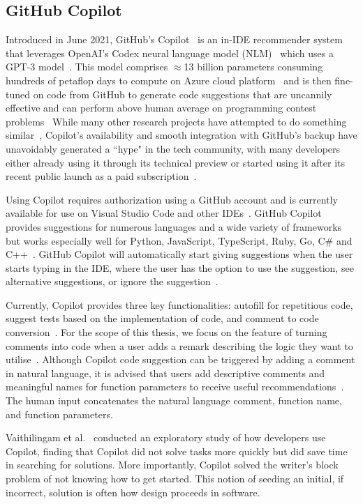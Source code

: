 \subsection{GitHub Copilot}
Introduced in June 2021, GitHub's Copilot~\cite{Copilot-web} is an in-IDE recommender system that leverages OpenAI's Codex neural language model (NLM)~\cite{copilot} which uses a GPT-3 model~\cite{Gpt3}. This model comprises $\approx$13 billion parameters consuming hundreds of petaflop days to compute on Azure cloud platform~\cite{copilot} and is then fine-tuned on code from GitHub to generate code suggestions that are uncannily effective and can perform above human average on programming contest problems~\cite{empirical_eval}
While many other research projects have attempted to do something similar~\cite{codesearch, natural, coacor}, Copilot's availability and smooth integration with GitHub's backup have unavoidably generated a ``hype" in the tech community, with many developers either already using it through its technical preview or started using it after its recent public launch as a paid subscription~\cite{Copilot-web}. 

Using Copilot requires authorization using a GitHub account and is currently available for use on Visual Studio Code and other IDEs~\cite{Copilot-web}. GitHub Copilot provides suggestions for numerous languages and a wide variety of frameworks but works especially well for Python, JavaScript, TypeScript, Ruby, Go, C\# and C++~\cite{Copilot-web}. GitHub Copilot will automatically start giving suggestions when the user starts typing in the IDE, where the user has the option to use the suggestion, see alternative suggestions, or ignore the suggestion~\cite{Copilot-web}.

Currently, Copilot provides three key functionalities: autofill for repetitious code, suggest tests based on the implementation of code, and comment to code conversion~\cite{Copilot-web}. For the scope of this thesis, we focus on the feature of turning comments into code when a user adds a remark describing the logic they want to utilise~\cite{Copilot-web}. 
Although Copilot code suggestion can be triggered by adding a comment in natural language, it is advised that users add descriptive comments and meaningful names for function parameters to receive useful recommendations~\cite{Copilot-web}. The human input concatenates the natural language comment, function name, and function parameters.

Vaithilingam et al.~\cite{Vaithilingam2022} conducted an exploratory study of how developers use Copilot, finding that Copilot did not solve tasks more quickly but did save time in searching for solutions. 
More importantly, Copilot solved the writer's block problem of not knowing how to get started. This notion of seeding an initial, if incorrect, solution is often how design proceeds in software. 

